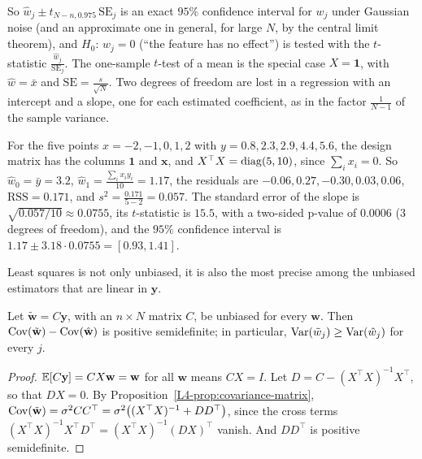 So $\hat w_j \pm t_{N-n, 0.975}\,\mathrm{SE}_j$ is an exact $95\%$ confidence interval for $w_j$ under Gaussian noise (and an approximate one in general, for large $N$, by the central limit theorem), and $H_0$: $w_j = 0$ (``the feature has no effect'') is tested with the $t$-statistic $\frac{\hat w_j}{\mathrm{SE}_j}$. The one-sample $t$-test of a mean is the special case $X = \mathbf{1}$, with $\hat w = \bar x$ and $\mathrm{SE} = \frac{s}{\sqrt{N}}$. Two degrees of freedom are lost in a regression with an intercept and a slope, one for each estimated coefficient, as in the factor $\frac{1}{N - 1}$ of the sample variance.

\begin{example}\label{L4-ex:regression-t}
    For the five points $x = -2, -1, 0, 1, 2$ with $y = 0.8, 2.3, 2.9, 4.4, 5.6$, the design matrix has the columns $\mathbf{1}$ and $\mathbf{x}$, and $X^\top X = \operatorname{diag}(5, 10)$, since $\sum_i x_i = 0$. So $\hat w_0 = \bar y = 3.2$, $\hat w_1 = \frac{\sum_i x_iy_i}{10} = 1.17$, the residuals are $-0.06, 0.27, -0.30, 0.03, 0.06$, $\mathrm{RSS} = 0.171$, and $s^2 = \frac{0.171}{5 - 2} = 0.057$. The standard error of the slope is $\sqrt{0.057/10} \approx 0.0755$, its $t$-statistic is $15.5$, with a two-sided p-value of $0.0006$ ($3$ degrees of freedom), and the $95\%$ confidence interval is $1.17 \pm 3.18 \cdot 0.0755 = [0.93, 1.41]$.
\end{example}

Least squares is not only unbiased, it is also the most precise among the unbiased estimators that are linear in $\mathbf{y}$.

\begin{proposition}\label{L4-prop:gauss-markov}
    Let $\tilde{\mathbf{w}} = C\mathbf{y}$, with an $n \times N$ matrix $C$, be unbiased for every $\mathbf{w}$. Then $\operatorname{Cov}(\tilde{\mathbf{w}}) - \operatorname{Cov}(\hat{\mathbf{w}})$ is positive semidefinite; in particular, $\operatorname{Var}(\tilde w_j) \geq \operatorname{Var}(\hat w_j)$ for every $j$.
\end{proposition}

\begin{proof}
    $\mathbb{E}[C\mathbf{y}] = CX\mathbf{w} = \mathbf{w}$ for all $\mathbf{w}$ means $CX = I$. Let $D = C - (X^\top X)^{-1}X^\top$, so that $DX = 0$. By Proposition~\ref{L4-prop:covariance-matrix}, $\operatorname{Cov}(\tilde{\mathbf{w}}) = \sigma^2CC^\top = \sigma^2\big((X^\top X)^{-1} + DD^\top\big)$, since the cross terms $(X^\top X)^{-1}X^\top D^\top = (X^\top X)^{-1}(DX)^\top$ vanish. And $DD^\top$ is positive semidefinite.
\end{proof}

